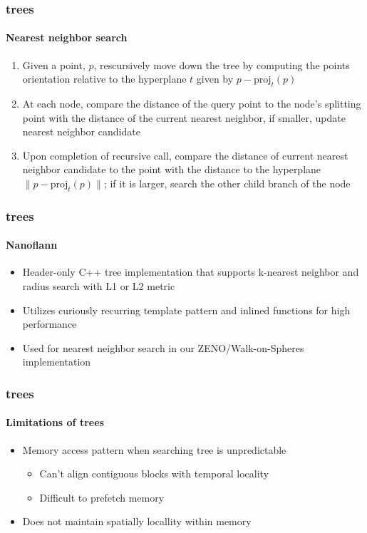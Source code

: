 \begin{frame}
  \frametitle{\kd trees}
  \framesubtitle{Nearest neighbor search}

  \begin{enumerate}
    \item Given a point, $p$, rescursively move down the tree by computing the points orientation relative to the 
      hyperplane $t$ given by $p - \text{proj}_t(p)$
    \item At each node, compare the distance of the query point to the node's splitting point with the distance
      of the current nearest neighbor, if smaller, update nearest neighbor candidate
    \item Upon completion of recursive call, compare the distance of current nearest neighbor 
      candidate to the point with the distance to the hyperplane $\|p - \text{proj}_t(p)\|$; 
      if it is larger, search the other child branch of the node
  \end{enumerate}

\end{frame}

\begin{frame}
  \frametitle{\kd trees}
  \framesubtitle{Nanoflann}

  \begin{itemize}
    \item Header-only C++ \kd tree implementation that supports k-nearest neighbor and radius search with 
      L1 or L2 metric
    \item Utilizes curiously recurring template pattern and inlined functions for high performance
    \item Used for nearest neighbor search in our ZENO/Walk-on-Spheres implementation 
  \end{itemize}

\end{frame}


\begin{frame}
  \frametitle{\kd trees}
  \framesubtitle{Limitations of trees}

  \begin{itemize}
    \item Memory access pattern when searching tree is unpredictable
      \begin{itemize}
        \item Can't align contiguous blocks with temporal locality
        \item Difficult to prefetch memory
      \end{itemize}
    \item Does not maintain spatially locallity within memory
  \end{itemize}
\end{frame}

